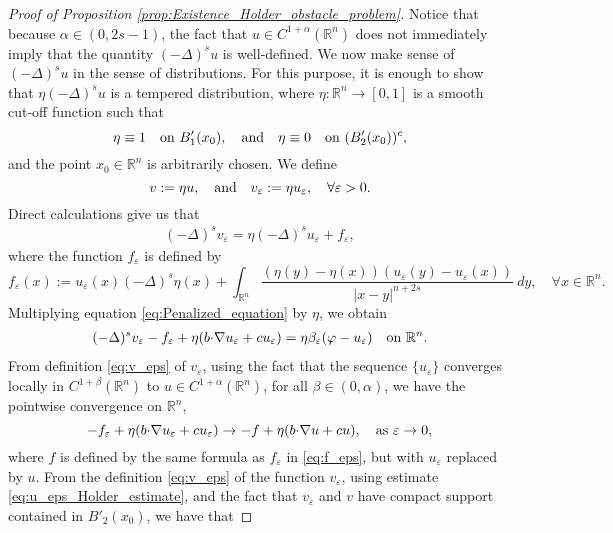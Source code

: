 \documentclass[11pt,reqno]{amsart}
\theoremstyle{definition}
\theoremstyle{remark}
\begin{document}
\begin{proof}[Proof of Proposition \ref{prop:Existence_Holder_obstacle_problem}]
Notice that because $\alpha\in(0,2s-1)$, the fact that $u \in C^{1+\alpha}({\mathbb{R}}^n)$ does not immediately imply that the quantity $(-\Delta)^s u$ is well-defined. We now make sense of $(-\Delta)^s u$ in the sense of distributions. For this purpose, it is enough to show that $\eta(-\Delta)^s u$ is a tempered distribution, where $\eta:{\mathbb{R}}^n\rightarrow [0,1]$ is a smooth cut-off function such that
\begin{equation}
\label{eq:Definition_eta}
\eta \equiv 1\quad\hbox{on }B'_1(x_0),\quad\hbox{and}\quad \eta \equiv 0\quad\hbox{on }(B'_2(x_0))^c,
\end{equation}
and the point $x_0\in{\mathbb{R}}^n$ is arbitrarily chosen. We define
\begin{equation}
\label{eq:v_eps}
v:=\eta u,\quad\hbox{and}\quad v_{\varepsilon}:=\eta u_{\varepsilon},\quad\forall {\varepsilon}>0.
\end{equation}
Direct calculations give us that
\begin{align}
\label{eq:Delta_s_v_cutoff}
(-\Delta)^s v_{\varepsilon} = \eta (-\Delta)^s u_{\varepsilon} + f_{\varepsilon},
\end{align}
where the function $f_{\varepsilon}$ is defined by
\begin{equation}
\label{eq:f_eps}
f_{\varepsilon}(x):=u_{\varepsilon}(x)(-\Delta)^s \eta(x)+\int_{{\mathbb{R}}^n}\frac{(\eta(y)-\eta(x))(u_{\varepsilon}(y)-u_{\varepsilon}(x))}{|x-y|^{n+2s}}\ dy,\quad\forall x\in{\mathbb{R}}^n.
\end{equation}
Multiplying equation \eqref{eq:Penalized_equation} by $\eta$, we obtain
\begin{align}
\label{eq:Penalized_equation_cutoff}
(-\Delta)^s v_{\varepsilon} -f_{\varepsilon} +\eta(b{\hbox{$\cdot$}}\nabla u_{\varepsilon}+c u_{\varepsilon}) = \eta\beta_{\varepsilon}(\varphi-u_{\varepsilon})\quad\hbox{on }{\mathbb{R}}^n.
\end{align}
From definition \eqref{eq:v_eps} of $v_{\varepsilon}$, using the fact that the sequence $\{u_{\varepsilon}\}$ converges locally in $C^{1+\beta}({\mathbb{R}}^n)$ to $u \in C^{1+\alpha}({\mathbb{R}}^n)$, for all $\beta \in (0,\alpha)$, we have the pointwise convergence on ${\mathbb{R}}^n$,
\begin{equation}
\label{eq:f_convergence}
-f_{\varepsilon} +\eta(b{\hbox{$\cdot$}}\nabla u_{\varepsilon}+c u_{\varepsilon}) \rightarrow -f + \eta(b{\hbox{$\cdot$}}\nabla u+c u),\quad\hbox{as }{\varepsilon}\rightarrow 0,
\end{equation}
where $f$ is defined by the same formula as $f_{\varepsilon}$ in \eqref{eq:f_eps}, but with $u_{\varepsilon}$ replaced by $u$. From the definition \eqref{eq:v_eps} of the function $v_{\varepsilon}$, using estimate \eqref{eq:u_eps_Holder_estimate}, and the fact that $v_{\varepsilon}$ and $v$ have compact support contained in $B'_2(x_0)$, we have that

\end{proof}
\end{document}
